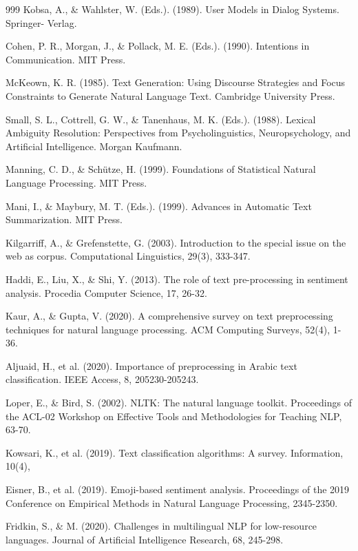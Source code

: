 \begin{thebibliography}{999}
 Kobsa, A., \& Wahlster, W. (Eds.). (1989). User Models in Dialog Systems. Springer- Verlag.

 Cohen, P. R., Morgan, J., \& Pollack, M. E. (Eds.). (1990). Intentions in Communication. MIT Press.

 McKeown, K. R. (1985). Text Generation: Using Discourse Strategies and Focus Constraints to Generate Natural Language Text. Cambridge University Press.

 Small, S. L., Cottrell, G. W., \& Tanenhaus, M. K. (Eds.). (1988). Lexical Ambiguity Resolution: Perspectives from Psycholinguistics, Neuropsychology, and Artificial Intelligence. Morgan Kaufmann.

 Manning, C. D., \& Schütze, H. (1999). Foundations of Statistical Natural Language Processing. MIT Press.

 Mani, I., \& Maybury, M. T. (Eds.). (1999). Advances in Automatic Text Summarization. MIT Press.

 Kilgarriff, A., \& Grefenstette, G. (2003). Introduction to the special issue on the web as corpus. Computational Linguistics, 29(3), 333-347.

 Haddi, E., Liu, X., \& Shi, Y. (2013). The role of text pre-processing in sentiment analysis. Procedia Computer Science, 17, 26-32.

 Kaur, A., \& Gupta, V. (2020). A comprehensive survey on text preprocessing techniques for natural language processing. ACM Computing Surveys, 52(4), 1-36.

 Aljuaid, H., et al. (2020). Importance of preprocessing in Arabic text classification. IEEE Access, 8, 205230-205243.

 Loper, E., \& Bird, S. (2002). NLTK: The natural language toolkit. Proceedings of the ACL-02 Workshop on Effective Tools and Methodologies for Teaching NLP, 63-70.

 Kowsari, K., et al. (2019). Text classification algorithms: A survey. Information, 10(4),

 Eisner, B., et al. (2019). Emoji-based sentiment analysis. Proceedings of the 2019 Conference on Empirical Methods in Natural Language Processing, 2345-2350.

 Fridkin, S., \& M. (2020). Challenges in multilingual NLP for low-resource languages. Journal of Artificial Intelligence Research, 68, 245-298.


\end{thebibliography}
